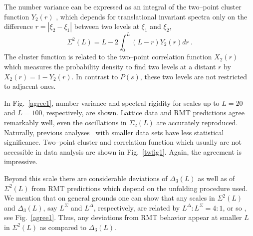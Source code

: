 The number variance can be expressed as an integral of the two--point
cluster function $Y_2(r)$ \cite{Mehta}, which depends for
translational invariant spectra only on the difference
$r=|\xi_2-\xi_1|$ between two levels at $\xi_1$ and $\xi_2$,
\begin{equation}
\Sigma^2(L)= L-2\int_{0}^{L}(L-r)Y_2(r)dr \ .
\label{mu2}
\end{equation}
The cluster function is related to the two--point correlation function
$X_2(r)$ which measures the probability density to find two levels at
a distant $r$ by $X_2(r)=1-Y_2(r)$.  In contrast to $P(s)$, these two
levels are not restricted to adjacent ones.  

In Fig.~\ref{agree1}, number variance and spectral rigidity for scales
up to $L=20$ and $L=100$, respectively, are shown. Lattice data and
RMT predictions agree remarkably well, even the oscillations in
$\Sigma_2(L)$ are accurately reproduced. Naturally, previous
analyses~\cite{halasz95} with smaller data sets have less statistical
significance.  Two--point cluster and correlation function which
usually are not accessible in data analysis are shown in
Fig.~\ref{twfig1}. Again, the agreement is impressive.

Beyond this scale there are considerable deviations of $\Delta_3(L)$
as well as of $\Sigma^2(L)$ from RMT predictions which depend on the
unfolding procedure used. We mention that on general grounds one can
show that any scales in $\Sigma^2(L)$ and $\Delta_3(L)$, say
$L^\Sigma$ and $L^\Delta$, respectively, are related by
$L^\Delta:L^\Sigma=4:1$, or so \cite{guhr97}, see Fig.~\ref{agree1}.
Thus, any deviations from RMT behavior appear at smaller $L$ in
$\Sigma^2(L)$ as compared to $\Delta_3(L)$.

